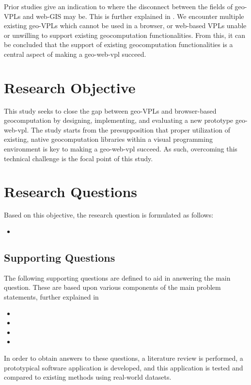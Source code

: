 Prior studies give an indication to where the disconnect between the fields of geo-VPLs and web-GIS may be. This is further explained in .
We encounter multiple existing geo-VPLs which cannot be used in a browser, or web-based VPLs unable or unwilling to support existing geocomputation functionalities. From this, it can be concluded that the support of existing geocomputation functionalities is a central aspect of making a geo-web-vpl succeed. 


\section{Research Objective}

This study seeks to close the gap between geo-VPLs and browser-based geocomputation by designing, implementing, and evaluating a new prototype \ac{geo-web-vpl}.
The study starts from the presupposition that proper utilization of existing, native geocomputation libraries within a visual programming environment is key to making a geo-web-vpl succeed. 
As such, overcoming this technical challenge is the focal point of this study. 

\section{Research Questions}
Based on this objective, the research question is formulated as follows: 
\begin{itemize}[ ]
  \item \myMainRQ
\end{itemize}

\subsection*{Supporting Questions}
The following supporting questions are defined to aid in answering the main question.
These are based upon various components of the main problem statements, further explained in 
\begin{itemize}[-]
  \item \mySubRQOne
  \item \mySubRQTwo
  \item \mySubRQThree
  \item \mySubRQFour
\end{itemize}
In order to obtain answers to these questions, a literature review is performed,
a prototypical software application is developed, 
and this application is tested and compared to existing methods using real-world datasets.


